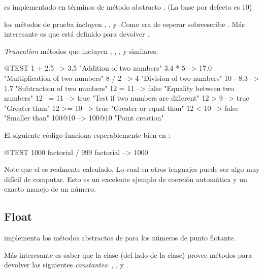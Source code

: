 \documentclass[a4paper,10pt,twoside]{book}
\begin{document}
 es implementado en t\'erminos de m\'etodo abstracto . (La base por defecto es 10)

los m\'etodos de prueba incluyen , ,  y .Como era de esperar  sobreescribe . M\'as interesante es que  est\'a definido para devolver .

\emph{Truncation} m\'etodos que incluyen , , ,  y similares.

\begin{code}{@TEST}
1 + 2.5     --> 3.5             "Addition of two numbers"
3.4 * 5      --> 17.0           "Multiplication of two numbers"
8 / 2         --> 4                 "Division of two numbers"
10 - 8.3   --> 1.7              "Subtraction of two numbers"
12 = 11    --> false           "Equality between two numbers"
12 ~= 11 --> true            "Test if two numbers are different"
12 > 9      --> true            "Greater than"
12 >= 10  --> true            "Greater or equal  than"
12 < 10    --> false           "Smaller than"
100@10   --> 100@10    "Point creation"
\end{code}

El siguiente c\'odigo funciona esperablemente bien en  \st:
\begin{code}{@TEST}
1000 factorial / 999 factorial --> 1000
\end{code}
Note que el  es realmente calculado. Lo cual en otros lenguajes puede ser algo muy dif\'icil de computar. Esto es un excelente ejemplo de coerci\'on autom\'atica y un exacto manejo de un n\'umero.



\subsection{Float}

 implementa los m\'etodos abstractos de  para los n\'umeros de punto flotante.

M\'as interesante es saber que la clase  (del lado de la clase) provee m\'etodos para devolver las siguientes \emph{constantes}: , ,  y .
\end{document}
